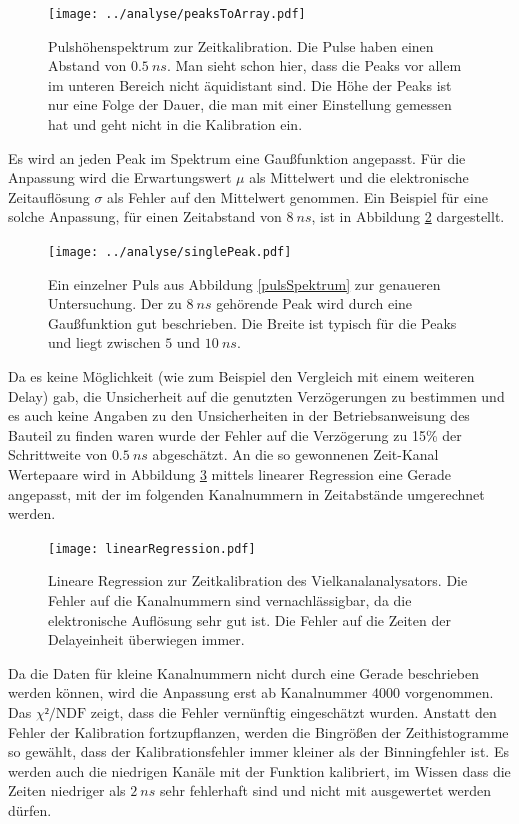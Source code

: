 \documentclass[a4paper,12pt]{article}
\begin{document}
\begin{figure}
	\texttt{[image: ../analyse/peaksToArray.pdf]}
	\caption{Pulshöhenspektrum zur Zeitkalibration. Die Pulse haben einen Abstand von
		$\SI{0.5}{ns}$. Man sieht schon hier, dass die Peaks vor allem im unteren Bereich nicht
	äquidistant sind. Die Höhe der Peaks ist nur eine Folge der Dauer, die man mit einer Einstellung
gemessen hat und geht nicht in die Kalibration ein.}
	\label{fig:pulsSpektrum}
\end{figure}


Es wird an jeden Peak  im Spektrum eine Gaußfunktion angepasst.
Für die Anpassung wird die Erwartungswert $μ$ als Mittelwert und die elektronische Zeitauflösung $σ$
als Fehler auf den Mittelwert genommen.
Ein Beispiel für eine solche Anpassung, für einen Zeitabstand von $\SI{8}{ns}$, ist in Abbildung \ref{fig:singlePuls} dargestellt.

\begin{figure}
	\texttt{[image: ../analyse/singlePeak.pdf]}
	\caption{Ein einzelner Puls aus Abbildung \ref{pulsSpektrum} zur genaueren Untersuchung. Der zu
	$\SI{8}{ns}$ gehörende Peak wird durch eine Gaußfunktion gut beschrieben. Die Breite ist typisch
	für die Peaks und liegt zwischen $5$ und $\SI{10}{ns}$.}
	\label{fig:singlePuls}
\end{figure}

Da es keine Möglichkeit (wie zum Beispiel den Vergleich mit einem weiteren Delay) gab, die Unsicherheit auf die genutzten Verzögerungen zu bestimmen und es auch keine Angaben zu
 den Unsicherheiten in der Betriebsanweisung des Bauteil zu finden waren wurde der Fehler auf die
 Verzögerung zu 15\% der Schrittweite von $\SI{0.5}{ns}$ abgeschätzt.
 An die so gewonnenen Zeit-Kanal Wertepaare wird in Abbildung \ref{fig:kalibrationsRegression} mittels linearer Regression eine Gerade angepasst, mit der im folgenden
Kanalnummern in Zeitabstände umgerechnet werden.

\begin{figure}
	\texttt{[image: linearRegression.pdf]}
	\caption{Lineare Regression zur Zeitkalibration des Vielkanalanalysators. Die Fehler auf die
	Kanalnummern sind vernachlässigbar, da die elektronische Auflösung sehr gut ist. Die Fehler auf
die Zeiten der Delayeinheit überwiegen immer.}
	\label{fig:kalibrationsRegression}
\end{figure}

Da die Daten für kleine Kanalnummern nicht durch eine Gerade beschrieben werden können, wird die
Anpassung erst ab Kanalnummer $4000$ vorgenommen.
Das $χ²/\text{NDF}$ zeigt, dass die Fehler vernünftig eingeschätzt wurden.
Anstatt den Fehler der Kalibration fortzupflanzen, werden die Bingrößen der Zeithistogramme so
gewählt, dass der Kalibrationsfehler immer kleiner als der Binningfehler ist.
Es werden auch die niedrigen Kanäle mit der Funktion kalibriert, im Wissen dass die Zeiten niedriger
als $\SI{2}{ns}$ sehr fehlerhaft sind und nicht mit ausgewertet werden dürfen.
\end{document}
